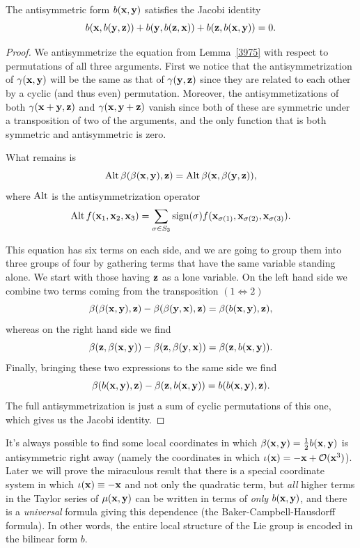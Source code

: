 \begin{lem}
    The antisymmetric form $b(\bf{x},\bf{y})$ satisfies the Jacobi identity
    \[b(\bf{x},b(\bf{y},\bf{z}))+b(\bf{y},b(\bf{z},\bf{x}))+b(\bf{z},b(\bf{x},\bf{y}))=0.\]
\end{lem}
\begin{proof}
    We antisymmetrize the equation from Lemma~\ref{3975} with respect to permutations of all three arguments. First we notice that the antisymmetrization of $\gamma(\bf{x},\bf{y})$ will be the same as that of $\gamma(\bf{y},\bf{z})$ since they are related to each other by a cyclic (and thus even) permutation. Moreover, the antisymmetizations of both $\gamma(\bf{x}+\bf{y},\bf{z})$ and $\gamma(\bf{x},\bf{y}+\bf{z})$ vanish since both of these are symmetric under a transposition of two of the arguments, and the only function that is both symmetric and antisymmetric is zero.

    What remains is 
    \[\Alt \beta(\beta(\bf{x},\bf{y}),\bf{z})=\Alt \beta(\bf{x},\beta(\bf{y},\bf{z})),\]
    where $\Alt$ is the antisymmetrization operator 
    \[\Alt f(\bf{x}_1,\bf{x}_2,\bf{x}_3)=\sum_{\sigma\in S_3}\sign(\sigma)f(\bf{x}_{\sigma(1)},\bf{x}_{\sigma(2)},\bf{x}_{\sigma(3)}).\]

    This equation has six terms on each side, and we are going to group them into three groups of four by gathering terms that have the same variable standing alone. We start with those having $\bf{z}$ as a lone variable. On the left hand side we combine two terms coming from the transposition $(1\Leftrightarrow2)$
    \[\beta(\beta(\bf{x},\bf{y}),\bf{z})-\beta(\beta(\bf{y},\bf{x}),\bf{z})=\beta(b(\bf{x},\bf{y}),\bf{z}),\]
    whereas on the right hand side we find
    \[\beta(\bf{z},\beta(\bf{x},\bf{y}))-\beta(\bf{z},\beta(\bf{y},\bf{x}))=\beta(\bf{z},b(\bf{x},\bf{y})).\]
    Finally, bringing these two expressions to the same side we find
    \[\beta(b(\bf{x},\bf{y}),\bf{z})-\beta(\bf{z},b(\bf{x},\bf{y}))=b(b(\bf{x},\bf{y}),\bf{z}).\]
    The full antisymmetrization is just a sum of cyclic permutations of this one, which gives us the Jacobi identity.
\end{proof}

\begin{rem}
    It's always possible to find some local coordinates in which $\beta(\bf{x},\bf{y})=\frac12 b(\bf{x},\bf{y})$ is antisymmetric right away (namely the coordinates in which $\iota(\bf{x})=-\bf{x}+\calO(\bf{x}^3)$). Later we will prove the miraculous result that there is a special coordinate system in which $\iota(\bf{x})\equiv-\bf{x}$ and not only the quadratic term, but \emph{all} higher terms in the Taylor series of $\mu(\bf{x},\bf{y})$ can be written in terms of \emph{only} $b(\bf{x},\bf{y})$, and there is a \emph{universal} formula giving this dependence (the Baker-Campbell-Hausdorff formula). In other words, the entire local structure of the Lie group is encoded in the bilinear form $b$.
\end{rem}



